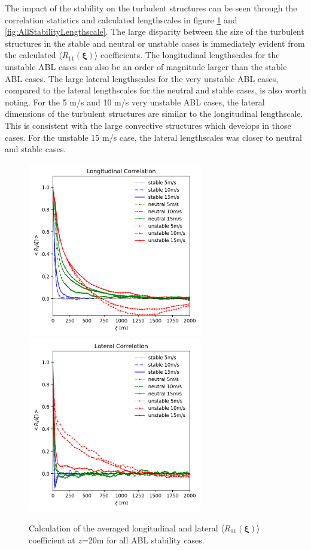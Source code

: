 The impact of the stability on the turbulent structures can be seen
through the correlation statistics and calculated lengthscales in
figure \ref{fig:AllStabilityRij} and
\ref{fig:AllStabilityLengthscale}.  The large disparity between the
size of the turbulent structures in the stable and neutral or unstable
cases is immediately evident from the calculated $\langle
R_{11}(\boldsymbol{\xi})\rangle$ coefficients.  The longitudinal
lengthscales for the unstable ABL cases can also be an order of
magnitude larger than the stable ABL cases.  The large lateral
lengthscales for the very unstable ABL cases, compared to the lateral
lengthscales for the neutral and stable cases, is also worth noting.
For the 5 m/s and 10 m/s very unstable ABL cases, the lateral
dimensions of the turbulent structures are similar to the longitudinal
lengthscale.  This is consistent with the large convective structures
which develops in those cases.  For the unstable 15 m/s case, the
lateral lengthscales was closer to neutral and stable cases.

\begin{figure}[hbt!]
  \centering
  \includegraphics[width=3in]{figures/AllStability_Rij_Longitudinal.png}
  \includegraphics[width=3in]{figures/AllStability_Rij_Lateral.png}
  \caption{ \label{fig:AllStabilityRij} Calculation of the averaged
    longitudinal and lateral $\langle R_{11}(\boldsymbol{\xi})\rangle$
    coefficient at $z$=20m for all ABL stability cases.}
\end{figure}

